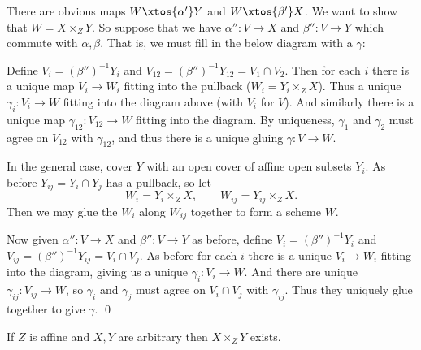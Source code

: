     There are obvious maps $W\xtos{\alpha'}Y$ and $W\xtos{\beta'}X$.
    We want to show that $W=X\times_ZY$.
    So suppose that we have $\alpha''\colon V\to X$ and $\beta''\colon V\to Y$ which commute with
    $\alpha,\beta$.
    That is, we must fill in the below diagram with a $\gamma$:


    Define $V_i=(\beta'')^{-1}Y_i$ and $V_{12}=(\beta'')^{-1}Y_{12}=V_1\cap V_2$.
    Then for each $i$ there is a unique map $V_i\to W_i$ fitting into the pullback ($W_i=Y_i\times_ZX$).
    Thus a unique $\gamma_i\colon V_i\to W$ fitting into the diagram above (with $V_i$ for $V$).
    And similarly there is a unique map $\gamma_{12}\colon V_{12}\to W$ fitting into the diagram.
    By uniqueness, $\gamma_1$ and $\gamma_2$ must agree on $V_{12}$ with $\gamma_{12}$, and thus there
    is a unique gluing $\gamma\colon V\to W$.

    In the general case, cover $Y$ with an open cover of affine open subsets $Y_i$.
    As before $Y_{ij}=Y_i\cap Y_j$ has a pullback, so let
    $$ W_i = Y_i\times_ZX,\qquad W_{ij} = Y_{ij}\times_ZX . $$
    Then we may glue the $W_i$ along $W_{ij}$ together to form a scheme $W$.

    Now given $\alpha''\colon V\to X$ and $\beta''\colon V\to Y$ as before, define
    $V_i=(\beta'')^{-1}Y_i$ and $V_{ij}=(\beta'')^{-1}Y_{ij}=V_i\cap V_j$.
    As before for each $i$ there is a unique $V_i\to W_i$ fitting into the diagram, giving us a unique
    $\gamma_i\colon V_i\to W$.
    And there are unique $\gamma_{ij}\colon V_{ij}\to W$, so $\gamma_i$ and $\gamma_j$ must agree on
    $V_i\cap V_j$ with $\gamma_{ij}$.
    Thus they uniquely glue together to give $\gamma$.
    \qed

\eproof

\blemm[name={pullbackxyarb}]

    If $Z$ is affine and $X,Y$ are arbitrary then $X\times_ZY$ exists.

